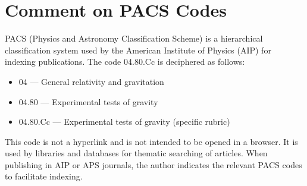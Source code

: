 \documentclass[12pt]{article}
\theoremstyle{remark}
\begin{document}
	\section{Comment on PACS Codes}
	\label{app:pacs}
	
	PACS (Physics and Astronomy Classification Scheme) is a hierarchical classification system used by the American Institute of Physics (AIP) for indexing publications. The code 04.80.Cc is deciphered as follows:
	\begin{itemize}
		\item 04 — General relativity and gravitation
		\item 04.80 — Experimental tests of gravity
		\item 04.80.Cc — Experimental tests of gravity (specific rubric)
	\end{itemize}
	This code is not a hyperlink and is not intended to be opened in a browser. It is used by libraries and databases for thematic searching of articles. When publishing in AIP or APS journals, the author indicates the relevant PACS codes to facilitate indexing.
	
\end{document}
